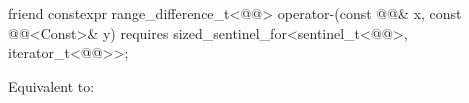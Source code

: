 %
\begin{itemdecl}
friend constexpr range_difference_t<@@>
  operator-(const @@& x, const @@<Const>& y)
    requires sized_sentinel_for<sentinel_t<@@>, iterator_t<@@>>;
\end{itemdecl}

\begin{itemdescr}
\pnum
\effects
Equivalent to: 
\end{itemdescr}
